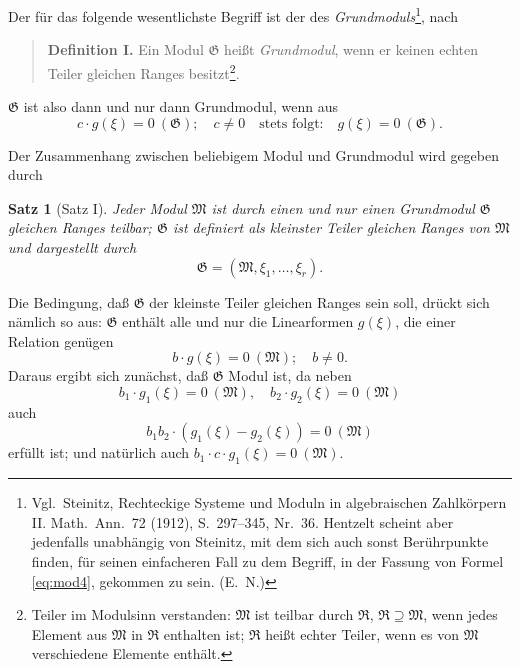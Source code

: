 \documentclass[fontsize=10pt,paper=a5,pagesize,headings=small]{scrbook}
\theoremstyle{plain}
\newtheorem*{satz}{Satz}
\begin{document}
Der für das folgende wesentlichste Begriff ist der des \textit{Grundmoduls}\footnote{Vgl.\ Steinitz,
Rechteckige Systeme und Moduln in algebraischen Zahlkörpern II. Math.\ Ann.\ 72 (1912),
S.~297--345, Nr.~36. Hentzelt scheint aber jedenfalls unabhängig von Steinitz, mit dem
sich auch sonst Berührpunkte finden, für seinen einfacheren Fall zu dem Begriff, in der
Fassung von Formel \eqref{eq:mod4}, gekommen zu sein. (E.~N.)}, nach

\begin{quote}
\textbf{Definition I.} Ein Modul $\mathfrak{G}$ heißt \textit{Grundmodul}, wenn er keinen echten Teiler
gleichen Ranges besitzt\footnote{Teiler im Modulsinn verstanden: $\mathfrak{M}$ ist teilbar durch $\mathfrak{R}$,
$\mathfrak{R} \supseteq \mathfrak{M}$, wenn jedes Element aus $\mathfrak{M}$ in $\mathfrak{R}$ enthalten ist; $\mathfrak{R}$ heißt echter Teiler,
wenn es von $\mathfrak{M}$ verschiedene Elemente enthält.}.
\end{quote}

$\mathfrak{G}$ ist also dann und nur dann Grundmodul, wenn aus
\begin{equation}
\label{eq:mod2}
c \cdot g(\xi) = 0\ (\mathfrak{G});\quad c \neq 0 \quad \text{stets folgt:}\quad g(\xi) = 0\ (\mathfrak{G}).
\end{equation}

Der Zusammenhang zwischen beliebigem Modul und Grundmodul wird gegeben durch

\begin{satz}[Satz I]
Jeder Modul $\mathfrak{M}$ ist durch einen und nur einen Grundmodul $\mathfrak{G}$ gleichen Ranges teilbar;
$\mathfrak{G}$ ist definiert als kleinster Teiler gleichen Ranges von $\mathfrak{M}$ und dargestellt durch
\begin{equation}
\label{eq:mod3}
\mathfrak{G} = (\mathfrak{M},\xi_1,\dots,\xi_r).
\end{equation}
\end{satz}

Die Bedingung, daß $\mathfrak{G}$ der kleinste Teiler gleichen Ranges sein soll, drückt sich
nämlich so aus: $\mathfrak{G}$ enthält alle und nur die Linearformen $g(\xi)$, die einer Relation genügen
\begin{equation}
\label{eq:mod4}
b \cdot g(\xi) = 0\ (\mathfrak{M});\quad b \neq 0.
\end{equation}
Daraus ergibt sich zunächst, daß $\mathfrak{G}$ Modul ist, da neben
\[ b_1 \cdot g_1(\xi) = 0\ (\mathfrak{M}),\quad b_2 \cdot g_2(\xi) = 0\ (\mathfrak{M}) \]
auch
\[ b_1 b_2 \cdot (g_1(\xi) - g_2(\xi)) = 0\ (\mathfrak{M}) \]
erfüllt ist; und natürlich auch $b_1 \cdot c \cdot g_1(\xi) = 0\ (\mathfrak{M})$.
\end{document}
